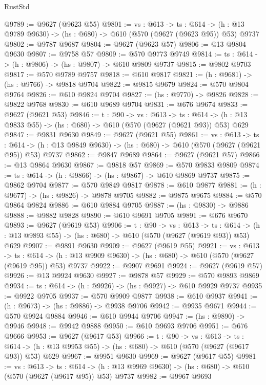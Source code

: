 \begin{lexlean}{RustStd}
\begin{coremodule}
@9789 := @9627 (@9623 @55)
@9801 := {vs : @613} ->
  {ts : @614} -> (h : @13 @9789 @9630) -> (hs : @680) -> @610 (@570 (@9627 (@9623 @95)) @53) @9737
@9802 := @9787 @9687
@9804 := @9627 (@9623 @57)
@9806 := @13 @9804 @9630
@9807 := @9758 @57
@9809 := @570 @9773 @9749
@9814 := {ts : @614} -> (h : @9806) -> (hs : @9807) -> @610 @9809 @9737
@9815 := @9802 @9703
@9817 := @570 @9789 @9757
@9818 := @610 @9817
@9821 := (h : @9681) -> (hs : @9766) -> @9818 @9704
@9822 := @9815 @9679
@9824 := @570 @9804 @9764
@9826 := @610 @9824 @9704
@9827 := (hs : @9770) -> @9826
@9828 := @9822 @9768
@9830 := @610 @9689 @9704
@9831 := @676 @9674
@9833 := @9627 (@9621 @53)
@9846 := {t : @90} ->
  {vs : @613} ->
  {ts : @614} -> (h : @13 @9833 @55) -> (hs : @680) -> @610 (@570 (@9627 (@9621 @93)) @53) @629
@9847 := @9831 @9630
@9849 := @9627 (@9621 @55)
@9861 := {vs : @613} ->
  {ts : @614} -> (h : @13 @9849 @9630) -> (hs : @680) -> @610 (@570 (@9627 (@9621 @95)) @53) @9737
@9862 := @9847 @9689
@9864 := @9627 (@9621 @57)
@9866 := @13 @9864 @9630
@9867 := @9818 @57
@9869 := @570 @9833 @9809
@9874 := {ts : @614} -> (h : @9866) -> (hs : @9867) -> @610 @9869 @9737
@9875 := @9862 @9704
@9877 := @570 @9849 @9817
@9878 := @610 @9877
@9881 := (h : @9677) -> (hs : @9826) -> @9878 @9705
@9882 := @9875 @9675
@9884 := @570 @9864 @9824
@9886 := @610 @9884 @9705
@9887 := (hs : @9830) -> @9886
@9888 := @9882 @9828
@9890 := @610 @9691 @9705
@9891 := @676 @9670
@9893 := @9627 (@9619 @53)
@9906 := {t : @90} ->
  {vs : @613} ->
  {ts : @614} -> (h : @13 @9893 @55) -> (hs : @680) -> @610 (@570 (@9627 (@9619 @93)) @53) @629
@9907 := @9891 @9630
@9909 := @9627 (@9619 @55)
@9921 := {vs : @613} ->
  {ts : @614} -> (h : @13 @9909 @9630) -> (hs : @680) -> @610 (@570 (@9627 (@9619 @95)) @53) @9737
@9922 := @9907 @9691
@9924 := @9627 (@9619 @57)
@9926 := @13 @9924 @9630
@9927 := @9878 @57
@9929 := @570 @9893 @9869
@9934 := {ts : @614} -> (h : @9926) -> (hs : @9927) -> @610 @9929 @9737
@9935 := @9922 @9705
@9937 := @570 @9909 @9877
@9938 := @610 @9937
@9941 := (h : @9673) -> (hs : @9886) -> @9938 @9706
@9942 := @9935 @9671
@9944 := @570 @9924 @9884
@9946 := @610 @9944 @9706
@9947 := (hs : @9890) -> @9946
@9948 := @9942 @9888
@9950 := @610 @9693 @9706
@9951 := @676 @9666
@9953 := @9627 (@9617 @53)
@9966 := {t : @90} ->
  {vs : @613} ->
  {ts : @614} -> (h : @13 @9953 @55) -> (hs : @680) -> @610 (@570 (@9627 (@9617 @93)) @53) @629
@9967 := @9951 @9630
@9969 := @9627 (@9617 @55)
@9981 := {vs : @613} ->
  {ts : @614} -> (h : @13 @9969 @9630) -> (hs : @680) -> @610 (@570 (@9627 (@9617 @95)) @53) @9737
@9982 := @9967 @9693

\end{coremodule}
\end{lexlean}
